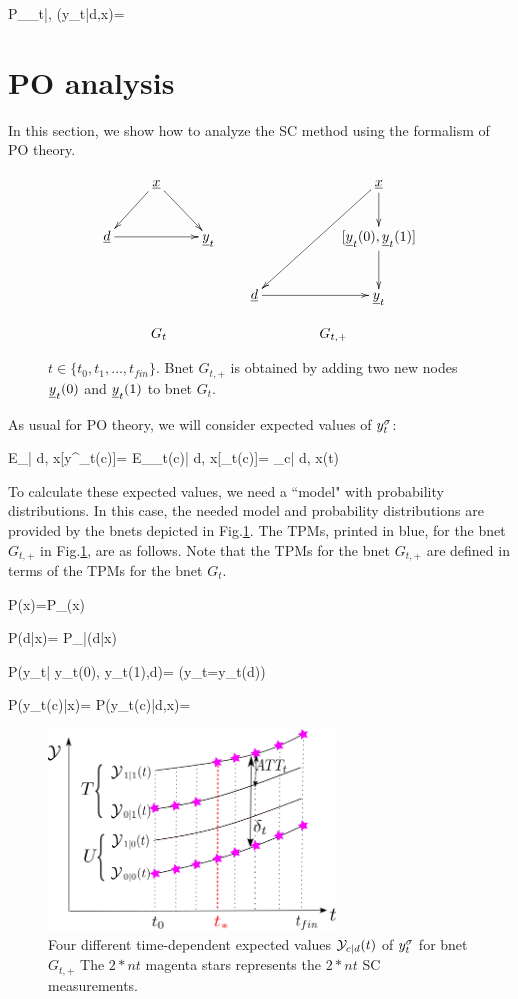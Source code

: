 \beq\color{blue}
P_{\rvy_t|\rvd, \rvx}(y_t|d,x)=
\eeq

\section{PO analysis}
In this section,
we show how
to analyze the
SC method
using the formalism of PO theory.



\begin{figure}[h!]
$$
\begin{array}{ccccc}
\xymatrix{
&\rvx\ar[dl]\ar[dr]
\\
\rvd\ar[rr]&&\rvy_t
}
&&
\xymatrix{
&&\rvx\ar[d]\ar[ddll]
\\
&&[\rvy_t(0), \rvy_t(1)]
\ar[d]
\\
\rvd\ar[rr]
&&\rvy_t
}
\\
\\
G_t&&G_{t, +}
\end{array}
$$
\caption{$t\in \{t_0, t_1, \ldots, 
t_{fin}\}$.
Bnet 
$G_{t,+}$
is obtained 
by adding
two new nodes
${\underline{y}}_t(0)$
and ${\underline{y}}_t(1)$ to bnet $G_t$.}
\label{fig-syn-con-G-+}
\end{figure}

As usual for PO theory,
we will consider
expected values of $y^\sigma_t$:


\beq
E_{\s| d, x}[y^\s_t(c)]=
 E_{\rvy_t(c)| d, x}[\rvy_t(c)]=
\caly_{c| d, x}(t)
\eeq

To calculate these
expected values, we need a ``model"
with probability 
distributions.
In this case,
the needed model and probability
distributions are
provided by the
bnets depicted in Fig.\ref{fig-syn-con-G-+}.
The TPMs,
printed in blue,
for the 
 bnet
$G_{t, +}$
in Fig.\ref{fig-syn-con-G-+},
are as follows.
Note
that the
TPMs for the bnet $G_{t, +}$
are defined in 
terms
of the TPMs for the bnet $G_t$.



\beq\color{blue}
P(x)=P_{\rvx}(x)
\eeq

\beq\color{blue}
P(d|x)= 
P_{\rvd|\rvx}(d|x)
\eeq
 
\beq\color{blue}
P(y_t| y_t(0), y_t(1),d)=
\indi(y_t=y_t(d))
\eeq

\beq\color{blue}
P(y_t(c)|x)=
P(y_t(c)|d,x)=
\eeq

\begin{figure}[h!]
\centering
\includegraphics[width=3in]
{syn-con/syn-con-bc.png}
\caption{Four different time-dependent
expected 
values ${\cal Y}_{c| d}(t)$ of $y^\sigma_t$
for bnet $G_{t, +}$
The $2*nt$ magenta  stars
represents the $2*nt$ SC measurements.} 
\label{fig-syn-con-bc}
\end{figure}



